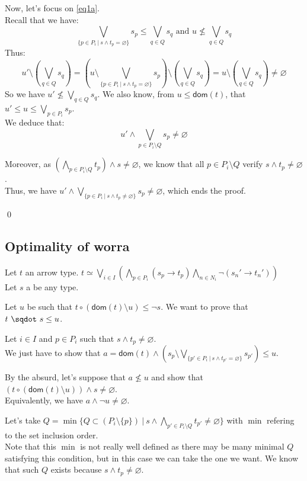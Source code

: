 \documentclass[a4paper]{article}%
\newcommand{\worra}[2]{#1\mathop{\,\sqdot\,} #2}
\newcommand{\apply}[2]{#1\circ#2}
\newcommand{\dom}[1]{\textsf{dom}(#1)}
\newcommand{\alt}{~|~}
\begin{document}
    Now, let's focus on \cref{eq1a}.\\
    Recall that we have:
    \[ \bigvee_{\{p \in P_i \alt s \land t_p = \varnothing\}}s_p \leq \bigvee_{q \in Q}s_q 
    \text{\ \ \ and\ \ \ } u \not\leq\bigvee_{q\in Q}s_q \]
    Thus:
    \[ u' \setminus \left(\bigvee_{q \in Q}s_q\right) = \left(u \setminus \bigvee_{\{p \in P_i \alt s \land t_p = \varnothing\}}s_p\right) \setminus \left(\bigvee_{q \in Q}s_q\right) = u \setminus \left(\bigvee_{q \in Q}s_q\right) \neq \varnothing \]
    So we have $ u' \not\leq\bigvee_{q\in Q}s_q $. We also know, from $u \leq \dom t$, that $u' \leq u \leq \bigvee_{p\in P_i}s_p$.\\

    We deduce that:
    \[ u' \land \bigvee_{p\in P_i \setminus Q}s_p \neq \varnothing \]

    Moreover, as $(\bigwedge_{p\in P_i\setminus Q}t_p) \land s \neq \varnothing$, we know that all $p \in P_i \setminus Q$ verify $s \land t_p \neq \varnothing$.\\
    Thus, we have $u' \land \bigvee_{\{p\in P_i\alt s\wedge t_p\not=\varnothing\}}s_p \neq \varnothing$, which ends the proof.
    
    \qed

    \pagebreak

    \subsection{Optimality of worra}

    Let $t$ an arrow type. $t \simeq \bigvee_{i\in I}\left(\bigwedge_{p\in P_i}(s_p\to t_p)\bigwedge_{n\in N_i}\neg(s_n'\to t_n')\right)$\\
    Let $s$ a be any type.

    Let $u$ be such that $\apply t {(\dom t \setminus u)} \leq \neg s$. We want to prove that $\worra t s \leq u$.

    Let $i \in I$ and $p \in P_i$ such that $s \land t_p \neq \varnothing$.\\
    We just have to show that $a = \dom t \land (s_p \setminus \bigvee_{\{p'\in P_i\alt s\wedge t_{p'}=\varnothing\}}s_{p'}) \leq u$.

    By the absurd, let's suppose that $a \not\leq u$ and show that $(\apply t {(\dom t \setminus u)}) \land s \neq \varnothing$.\\
    Equivalently, we have $a \land \neg u \neq \varnothing$.

    Let's take $Q = \min \{ Q \subset (P_i \setminus \{p\}) \alt s \land \bigwedge_{p' \in P_i\setminus Q} t_{p'} \neq \varnothing \}$ with $\min$ refering to the set inclusion order.\\
    Note that this $\min$ is not really well defined as there may be many minimal $Q$ satisfying this condition, but in this case we can take the one we want.
    We know that such $Q$ exists because $s \land t_p \neq \varnothing$.
\end{document}
